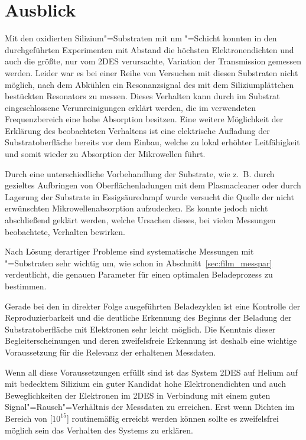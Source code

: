 \chapter{Ausblick}

Mit den oxidierten Silizium"=Substraten mit \unit[200]{nm} \SiO"=Schicht konnten in den durchgeführten Experimenten mit Abstand die höchsten Elektronendichten und auch die größte, nur vom 2DES verursachte, Variation der Transmission gemessen werden. Leider war es bei einer Reihe von Versuchen mit diesen Substraten nicht möglich, nach dem Abkühlen ein Resonanzsignal des mit dem Siliziumplättchen bestückten Resonators zu messen. Dieses Verhalten kann durch im Substrat eingeschlossene Verunreinigungen erklärt werden, die im verwendeten Frequenzbereich eine hohe Absorption besitzen. Eine weitere Möglichkeit der Erklärung des beobachteten Verhaltens ist eine elektrische Aufladung der Substratoberfläche bereits vor dem Einbau, welche zu lokal erhöhter Leitfähigkeit und somit wieder zu Absorption der Mikrowellen führt.

Durch eine unterschiedliche Vorbehandlung der Substrate, wie z.~B. durch gezieltes Aufbringen von Oberflächenladungen mit dem Plasmacleaner oder durch Lagerung der Substrate in Essigsäuredampf wurde versucht die Quelle der nicht erwünschten Mikrowellenabsorption aufzudecken.  Es konnte jedoch nicht abschließend geklärt werden, welche Ursachen dieses, bei vielen Messungen beobachtete, Verhalten bewirken. 

Nach Lösung derartiger Probleme sind systematische Messungen mit \SiO"=Substraten sehr wichtig um, wie schon in Abschnitt~\ref{sec:film_messpar} verdeutlicht, die genauen Parameter für einen optimalen Beladeprozess zu bestimmen. 

Gerade bei den in direkter Folge ausgeführten Beladezyklen ist eine Kontrolle der Reproduzierbarkeit und die deutliche Erkennung des Beginns der Beladung der Substratoberfläche mit Elektronen sehr leicht möglich. Die Kenntnis dieser Begleiterscheinungen und deren zweifelsfreie Erkennung ist deshalb eine wichtige Voraussetzung für die Relevanz der erhaltenen Messdaten.

Wenn all diese Voraussetzungen erfüllt sind ist das System 2DES auf Helium auf mit \SiO{} bedecktem Silizium ein guter Kandidat hohe Elektronendichten und auch Beweglichkeiten der Elektronen im 2DES in Verbindung mit einem guten Signal"=Rausch"=Verhältnis der Messdaten zu erreichen. Erst wenn Dichten im Bereich von \unit[$10^{15}$]{\Em} routinemäßig erreicht werden können sollte es zweifelsfrei möglich sein das Verhalten des Systems zu erklären.

